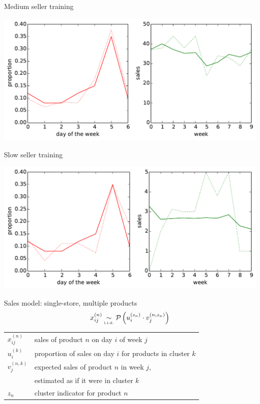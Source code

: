\documentclass{beamer}
\begin{document}
\begin{frame}{Medium seller training}
  \begin{center}
  \includegraphics[width=0.8\columnwidth]{medium_learning.pdf}
 \end{center}
\end{frame}

\begin{frame}{Slow seller training}
  \begin{center}
  \includegraphics[width=0.8\columnwidth]{slow_learning.pdf}
 \end{center}
\end{frame}

\begin{frame}{Sales model: single-store, multiple products}
 \begin{equation}
  x_{ij}^{(n)} \underset{\text{\tiny i.i.d.}}{\sim} \mathcal{P}\left(u_i^{(z_n)} \cdot v_j^{(n,z_n)}\right)
 \end{equation}
 \begin{tabular}{ll}
  $x_{ij}^{(n)}$ & sales of product $n$ on day $i$ of week $j$ \\
  $u_i^{(k)}$    & proportion of sales on day $i$ for products in cluster $k$ \\
  $v_j^{(n,k)}$  & expected sales of product $n$ in week $j$, \\
                 & \qquad estimated as if it were in cluster $k$ \\
  $z_n$          & cluster indicator for product $n$
 \end{tabular}
\end{frame}
\end{document}
